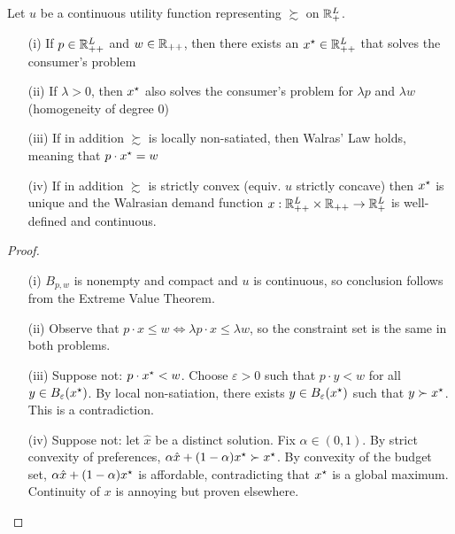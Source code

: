 \documentclass[12pt]{article}
\begin{document}
\begin{proposition}\label{prop:properties_of_x}
	 Let $u$ be a continuous utility function representing $\succsim$ on $\mathbb{R}^L_+$.
	\begin{itemize}
		\item[(i)] If $p \in \mathbb{R}^L_{++}$ and $w \in \mathbb{R}_{++}$, then there exists an $x^\star \in \mathbb{R}^L_{++}$ that solves the consumer's problem
		\item[(ii)] If $\lambda > 0$, then $x^\star$ also solves the consumer's problem for $\lambda p$ and $\lambda w$ (homogeneity of degree 0)
		\item[(iii)] If in addition $\succsim$ is locally non-satiated, then Walras' Law holds, meaning that $p \cdot x^\star = w$
		\item[(iv)] If in addition $\succsim$ is strictly convex (equiv. $u$ strictly concave) then $x^\star$ is unique and the Walrasian demand function $x : \mathbb{R}^L_{++} \times \mathbb{R}_{++} \to \mathbb{R}^L_+$ is well-defined and continuous.
	\end{itemize}
\end{proposition}
\begin{proof}
	\begin{itemize}
		\item[(i)] $B_{p,w}$ is nonempty and compact and $u$ is continuous, so conclusion follows from the Extreme Value Theorem.
		
		\item[(ii)] Observe that $p \cdot x \le w \Longleftrightarrow \lambda p \cdot x \le \lambda w$, so the constraint set is the same in both problems.
		
		\item[(iii)] Suppose not: $p \cdot x^\star < w$. Choose $\varepsilon > 0$ such that $p \cdot y < w$ for all $y \in B_\varepsilon(x^\star)$. By local non-satiation, there exists $y \in B_\varepsilon(x^\star)$ such that $y \succ x^\star$. This is a contradiction.
		
		\item[(iv)] Suppose not: let $\hat{x}$ be a distinct solution. Fix $\alpha \in (0,1)$. By strict convexity of preferences, $\alpha \hat{x} + (1-\alpha)x^\star \succ x^\star$. By convexity of the budget set, $\alpha \hat{x} + (1-\alpha)x^\star$ is affordable, contradicting that $x^\star$ is a global maximum. Continuity of $x$ is annoying but proven elsewhere.
	\end{itemize}
\end{proof}
\end{document}
